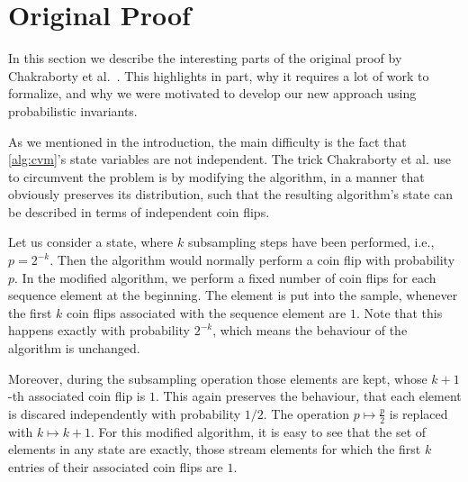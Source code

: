\section{Original Proof}
In this section we describe the interesting parts of the original proof by Chakraborty et al.~\cite{chakraborty2022}.
This highlights in part, why it requires a lot of work to formalize, and why we were motivated to develop our new approach using probabilistic invariants.

As we mentioned in the introduction, the main difficulty is the fact that \cref{alg:cvm}'s state variables are not independent.
The trick Chakraborty et al. use to circumvent the problem is by modifying the algorithm, in a manner that obviously preserves its distribution, such that the resulting algorithm's state can be described in terms of independent coin flips.

Let us consider a state, where $k$ subsampling steps have been performed, i.e., $p = 2^{-k}$. 
Then the algorithm would normally perform a coin flip with probability $p$.
In the modified algorithm, we perform a fixed number of coin flips for each sequence element at the beginning.
The element is put into the sample, whenever the first $k$ coin flips associated with the sequence element are $1$.
Note that this happens exactly with probability $2^{-k}$, which means the behaviour of the algorithm is unchanged.

Moreover, during the subsampling operation those elements are kept, whose $k+1$-th associated coin flip is $1$.
This again preserves the behaviour, that each element is discared independently with probability $1/2$.
The operation $p \mapsto \frac{p}{2}$ is replaced with $k \mapsto k+1$.
For this modified algorithm, it is easy to see that the set of elements in any state are exactly, those stream elements for which the first $k$ entries of their associated coin flips are $1$.


